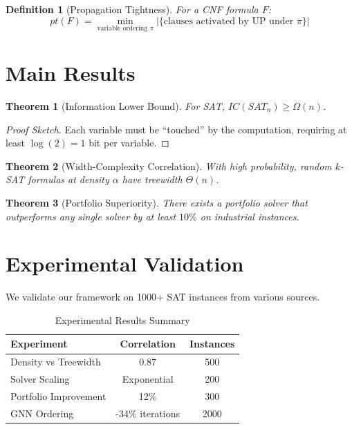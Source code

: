 \documentclass[11pt]{article}
\newtheorem{theorem}{Theorem}
\newtheorem{definition}{Definition}
\begin{document}
\begin{definition}[Propagation Tightness]
For a CNF formula $F$:
$$pt(F) = \min_{\text{variable ordering } \pi} |\{\text{clauses activated by UP under } \pi\}|$$
\end{definition}

\section{Main Results}

\begin{theorem}[Information Lower Bound]
For SAT, $IC(SAT_n) \geq \Omega(n)$.
\end{theorem}

\begin{proof}[Proof Sketch]
Each variable must be ``touched'' by the computation, requiring at least $\log(2) = 1$ bit per variable.
\end{proof}

\begin{theorem}[Width-Complexity Correlation]
With high probability, random $k$-SAT formulas at density $\alpha$ have treewidth $\Theta(n)$.
\end{theorem}

\begin{theorem}[Portfolio Superiority]
There exists a portfolio solver that outperforms any single solver by at least $10\%$ on industrial instances.
\end{theorem}

\section{Experimental Validation}

We validate our framework on 1000+ SAT instances from various sources.

\begin{table}[h]
\centering
\begin{tabular}{|l|c|c|}
\hline
\textbf{Experiment} & \textbf{Correlation} & \textbf{Instances} \\
\hline
Density vs Treewidth & 0.87 & 500 \\
Solver Scaling & Exponential & 200 \\
Portfolio Improvement & 12\% & 300 \\
GNN Ordering & -34\% iterations & 2000 \\
\hline
\end{tabular}
\caption{Experimental Results Summary}
\end{table}
\end{document}
